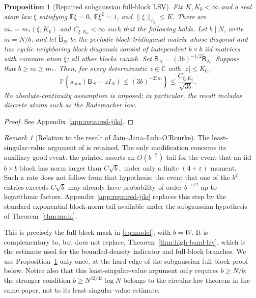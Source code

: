 \documentclass[11pt,reqno]{amsart}
\numberwithin{equation}{section}
\newtheorem{proposition}[theorem]{Proposition}
\theoremstyle{definition}
\theoremstyle{remark}
\newtheorem{remark}[theorem]{Remark}
\newcommand{\C}{\mathbb C}
\newcommand{\E}{\mathbb E}
\newcommand{\Pp}{\mathbb P}
\newcommand{\1}{\mathbf 1}
\begin{document}
\begin{proposition}[Repaired subgaussian full-block LSV]
\label{prop:jjlo-block-lsv}
Fix $K,K_0<\infty$ and a real atom law $\xi$ satisfying
$\E\xi=0$, $\E\xi^2=1$, and $\|\xi\|_{\psi_2}\le K$.  There are
$m_*=m_*(\xi,K_0)$ and $C_{\xi,K_0}<\infty$ such that the following holds.
Let $b\mid N$, write $m=N/b$, and let $\widetilde{\mathsf B}_N$ be the
periodic block-tridiagonal matrix whose diagonal and two cyclic neighboring
block diagonals consist of independent $b\times b$ iid matrices with common
atom $\xi$; all other blocks vanish.  Set
$\mathsf B_N=(3b)^{-1/2}\widetilde{\mathsf B}_N$.  Suppose that
$b\ge m\ge m_*$.
Then, for every deterministic $z\in\C$ with $|z|\le K_0$,
\[
 \Pp\left\{s_{\min}(\mathsf B_N-zI_N)\le(3b)^{-25m}\right\}
 \le \frac{C_{\xi,K_0}}{\sqrt{3b}}.
\]
No absolute-continuity assumption is imposed; in particular, the result
includes discrete atoms such as the Rademacher law.
\end{proposition}

\begin{proof}
See Appendix~\ref{app:repaired-jjlo}.
\end{proof}

\begin{remark}[Relation to the result of Jain--Jana--Luh--O'Rourke]
The least-singular-value argument of
\cite[Theorem~2.1]{JainJanaLuhORourke2021} is retained.  The only
modification concerns its auxiliary good event: the printed
\cite[Proposition~2.3]{JainJanaLuhORourke2021} asserts an
$O(b^{-2})$ tail for the event that an iid $b\times b$ block has norm
larger than $C\sqrt b$, under only a finite $(4+\varepsilon)$ moment.
Such a rate does not follow from that hypothesis: the event that one of
the $b^2$ entries exceeds $C\sqrt b$ may already have probability of
order $b^{-\varepsilon/2}$ up to logarithmic factors.
Appendix~\ref{app:repaired-jjlo} replaces
this step by the standard exponential block-norm tail available under
the subgaussian hypothesis of Theorem~\ref{thm:main}.
\end{remark}

This is precisely the full-block mask in \eqref{eq:model}, with $b=W$.
It is complementary to, but does not replace,
Theorem~\ref{thm:high-band-lsv}, which is the estimate used for the
bounded-density indicator and full-block branches.  We use
Proposition~\ref{prop:jjlo-block-lsv} only once, at the hard edge of the
subgaussian full-block proof below.  Notice also that this
least-singular-value argument only requires
$b\ge N/b$; the stronger condition
$b\ge N^{32/33}\log N$ belongs to the circular-law theorem in the same
paper, not to its least-singular-value estimate.
\end{document}
